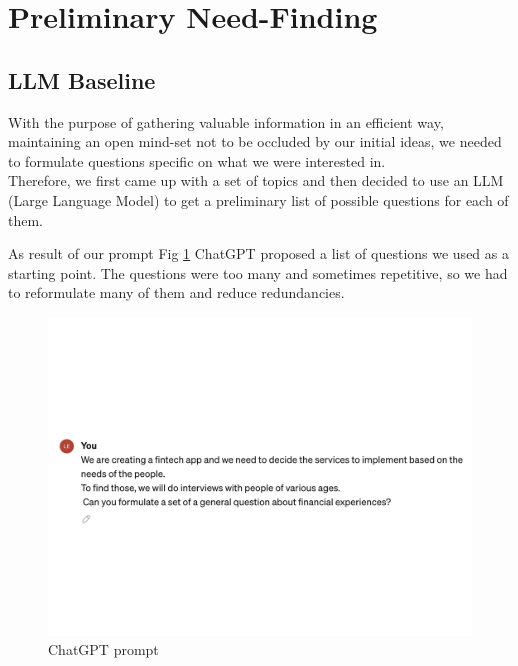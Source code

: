 \section{Preliminary Need-Finding}
\subsection{LLM Baseline}

With the purpose of gathering valuable information in an efficient way, maintaining an open mind-set not to be occluded by our initial ideas, we needed to formulate questions specific on what we were interested in.\\
Therefore, we first came up with a set of topics and then decided to use an LLM (Large Language Model) to get a preliminary list of possible questions for each of them.




As result of our prompt Fig \ref{fig_prompt} ChatGPT proposed a list of questions we used as a starting point. The questions were too many and sometimes repetitive, so we had to reformulate many of them and reduce redundancies.\\
\begin{figure}[ht]
    \centering
    \includegraphics[width=0.5\linewidth]{figures/prompt.png}
    \caption{ChatGPT prompt}
    \label{fig_prompt}
\end{figure}

